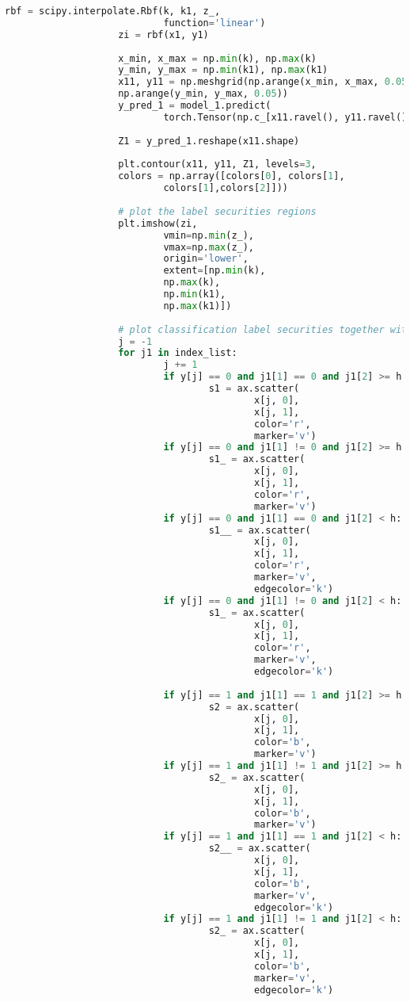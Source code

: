 \documentclass[english]{HSMW-Thesis}
\begin{document}
\begin{lstlisting}[caption = contour.py, style=chstyle, language=Python]
					rbf = scipy.interpolate.Rbf(k, k1, z_,
							function='linear')
					zi = rbf(x1, y1)
	
					x_min, x_max = np.min(k), np.max(k)
					y_min, y_max = np.min(k1), np.max(k1)
					x11, y11 = np.meshgrid(np.arange(x_min, x_max, 0.05),
					np.arange(y_min, y_max, 0.05))
					y_pred_1 = model_1.predict(
							torch.Tensor(np.c_[x11.ravel(), y11.ravel()]))
				
					Z1 = y_pred_1.reshape(x11.shape)
				
					plt.contour(x11, y11, Z1, levels=3,
					colors = np.array([colors[0], colors[1],
							colors[1],colors[2]]))
	
					# plot the label securities regions
					plt.imshow(zi,
							vmin=np.min(z_),
							vmax=np.max(z_),
							origin='lower',
							extent=[np.min(k),
							np.max(k),
							np.min(k1),
							np.max(k1)])
	
					# plot classification label securities together with rejected classifications based on a threshold security 
					j = -1
					for j1 in index_list:
							j += 1
							if y[j] == 0 and j1[1] == 0 and j1[2] >= h:
									s1 = ax.scatter(
											x[j, 0],
											x[j, 1],
											color='r', 
											marker='v')
							if y[j] == 0 and j1[1] != 0 and j1[2] >= h:
									s1_ = ax.scatter(
											x[j, 0],
											x[j, 1], 
											color='r', 
											marker='v')
							if y[j] == 0 and j1[1] == 0 and j1[2] < h:
									s1__ = ax.scatter(
											x[j, 0],
											x[j, 1], 
											color='r', 
											marker='v', 
											edgecolor='k')
							if y[j] == 0 and j1[1] != 0 and j1[2] < h:
									s1_ = ax.scatter(
											x[j, 0], 
											x[j, 1], 
											color='r', 
											marker='v', 
											edgecolor='k')
	
							if y[j] == 1 and j1[1] == 1 and j1[2] >= h:
									s2 = ax.scatter(
											x[j, 0], 
											x[j, 1], 
											color='b', 
											marker='v')
							if y[j] == 1 and j1[1] != 1 and j1[2] >= h:
									s2_ = ax.scatter(
											x[j, 0], 
											x[j, 1], 
											color='b', 
											marker='v')
							if y[j] == 1 and j1[1] == 1 and j1[2] < h:
									s2__ = ax.scatter(
											x[j, 0], 
											x[j, 1], 
											color='b', 
											marker='v', 
											edgecolor='k')
							if y[j] == 1 and j1[1] != 1 and j1[2] < h:
									s2_ = ax.scatter(
											x[j, 0], 
											x[j, 1], 
											color='b', 
											marker='v', 
											edgecolor='k')
	

\end{lstlisting}
\end{document}
